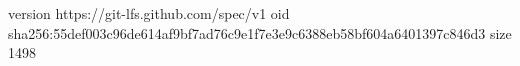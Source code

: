 version https://git-lfs.github.com/spec/v1
oid sha256:55def003c96de614af9bf7ad76c9e1f7e3e9c6388eb58bf604a6401397c846d3
size 1498
